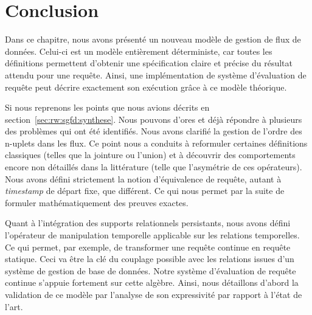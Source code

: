 \section{Conclusion}\label{sec:contrib:astral:conclusion}
Dans ce chapitre, nous avons présenté un nouveau modèle de gestion de flux de données. Celui-ci est un modèle entièrement déterministe, car toutes les définitions permettent d'obtenir une spécification claire et précise du résultat attendu pour une requête. Ainsi, une implémentation de système d'évaluation de requête peut décrire exactement son exécution grâce à ce modèle théorique.

Si nous reprenons les points que nous avions décrits en section~\ref{sec:rw:sgfd:synthese}. Nous pouvons d’ores et déjà répondre à plusieurs des problèmes qui ont été identifiés. Nous avons clarifié la gestion de l'ordre des n-uplets dans les flux. Ce point nous a conduits à reformuler certaines définitions classiques (telles que la jointure ou l'union) et à découvrir des comportements encore non détaillés dans la littérature (telle que l'asymétrie de ces opérateurs). Nous avons défini strictement la notion d'équivalence de requête, autant à \textit{timestamp} de départ fixe, que différent. Ce qui nous permet par la suite de formuler mathématiquement des preuves exactes.

Quant à l'intégration des supports relationnels persistants, nous avons défini l'opérateur de manipulation temporelle applicable sur les relations temporelles. Ce qui permet, par exemple, de transformer une requête continue en requête statique. Ceci va être la clé du couplage possible avec les relations issues d'un système de gestion de base de données. Notre système d'évaluation de requête continue s'appuie fortement sur cette algèbre. Ainsi, nous détaillons d'abord la validation de ce modèle par l'analyse de son expressivité par rapport à l'état de l'art.
